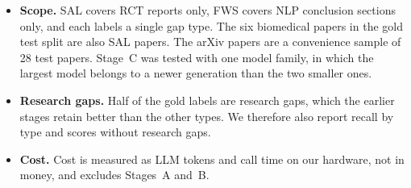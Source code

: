 \begin{itemize}
  \item \textbf{Scope.} SAL covers RCT reports only, FWS covers NLP conclusion sections only, and each labels a single gap type. The six biomedical papers in the gold test split are also SAL papers. The arXiv papers are a convenience sample of 28 test papers. Stage~C was tested with one model family, in which the largest model belongs to a newer generation than the two smaller ones.
  \item \textbf{Research gaps.} Half of the gold labels are research gaps, which the earlier stages retain better than the other types. We therefore also report recall by type and scores without research gaps.
  \item \textbf{Cost.} Cost is measured as LLM tokens and call time on our hardware, not in money, and excludes Stages~A and~B.
\end{itemize}
